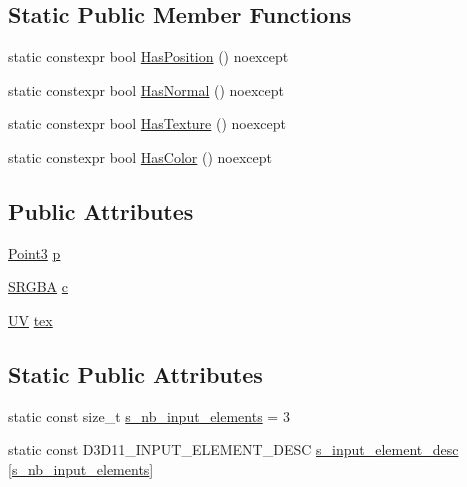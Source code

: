 \subsection*{Static Public Member Functions}
\begin{DoxyCompactItemize}
\item 
static constexpr bool \hyperlink{structmage_1_1_vertex_position_color_texture_aa80fcb7271cfe6bb2d89b0a7655e8984}{Has\+Position} () noexcept
\item 
static constexpr bool \hyperlink{structmage_1_1_vertex_position_color_texture_ab6b754deb3139e8b669daae14ae67ba8}{Has\+Normal} () noexcept
\item 
static constexpr bool \hyperlink{structmage_1_1_vertex_position_color_texture_aac2da4c1e9233e6c480c4629718f0a1e}{Has\+Texture} () noexcept
\item 
static constexpr bool \hyperlink{structmage_1_1_vertex_position_color_texture_a3eeee863375fee721cbb8e516a582a1e}{Has\+Color} () noexcept
\end{DoxyCompactItemize}
\subsection*{Public Attributes}
\begin{DoxyCompactItemize}
\item 
\hyperlink{structmage_1_1_point3}{Point3} \hyperlink{structmage_1_1_vertex_position_color_texture_a145c2e2fce90b07252b778b46e31ea24}{p}
\item 
\hyperlink{structmage_1_1_s_r_g_b_a}{S\+R\+G\+BA} \hyperlink{structmage_1_1_vertex_position_color_texture_a74c470e36536a800657daef6de1e8e9f}{c}
\item 
\hyperlink{structmage_1_1_u_v}{UV} \hyperlink{structmage_1_1_vertex_position_color_texture_adfbaa105e46bb65f502ec33eaa2e8b15}{tex}
\end{DoxyCompactItemize}
\subsection*{Static Public Attributes}
\begin{DoxyCompactItemize}
\item 
static const size\+\_\+t \hyperlink{structmage_1_1_vertex_position_color_texture_a410ce891e3fd47674af7106ef080ee99}{s\+\_\+nb\+\_\+input\+\_\+elements} = 3
\item 
static const D3\+D11\+\_\+\+I\+N\+P\+U\+T\+\_\+\+E\+L\+E\+M\+E\+N\+T\+\_\+\+D\+E\+SC \hyperlink{structmage_1_1_vertex_position_color_texture_a19df72ffa15fae0b389b9f66d7b8f3bd}{s\+\_\+input\+\_\+element\+\_\+desc} \mbox{[}\hyperlink{structmage_1_1_vertex_position_color_texture_a410ce891e3fd47674af7106ef080ee99}{s\+\_\+nb\+\_\+input\+\_\+elements}\mbox{]}
\end{DoxyCompactItemize}


